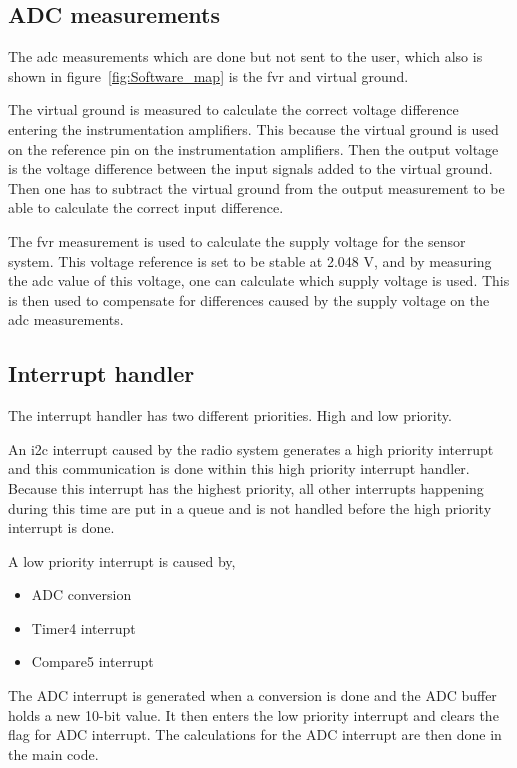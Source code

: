 \subsection{ADC measurements}

The \ac{adc} measurements which are done but not sent to the user, which also is shown in figure~\ref{fig:Software_map} is the \ac{fvr} and virtual ground. 

The virtual ground is measured to calculate the correct voltage difference entering the instrumentation amplifiers. This because the virtual ground is used on the reference pin on the instrumentation amplifiers. Then the output voltage is the voltage difference between the input signals added to the virtual ground. Then one has to subtract the virtual ground from the output measurement to be able to calculate the correct input difference.

The \ac{fvr} measurement is used to calculate the supply voltage for the sensor system. This voltage reference is set to be stable at 2.048 V, and by measuring the \ac{adc} value of this voltage, one can calculate which supply voltage is used. This is then used to compensate for differences caused by the supply voltage on the \ac{adc} measurements.



\subsection{Interrupt handler}

The interrupt handler has two different priorities. High and low priority.

An \ac{i2c} interrupt caused by the radio system generates a high priority interrupt and this communication is done within this high priority interrupt handler. Because this interrupt has the highest priority, all other interrupts happening during this time are put in a queue and is not handled before the high priority interrupt is done.


A low priority interrupt is caused by,

\begin{itemize}
    \item ADC conversion
    \item Timer4 interrupt
    \item Compare5 interrupt
\end{itemize}

The ADC interrupt is generated when a conversion is done and the ADC buffer holds a new 10-bit value. It then enters the low priority interrupt and clears the flag for ADC interrupt. The calculations for the ADC interrupt are then done in the main code.

